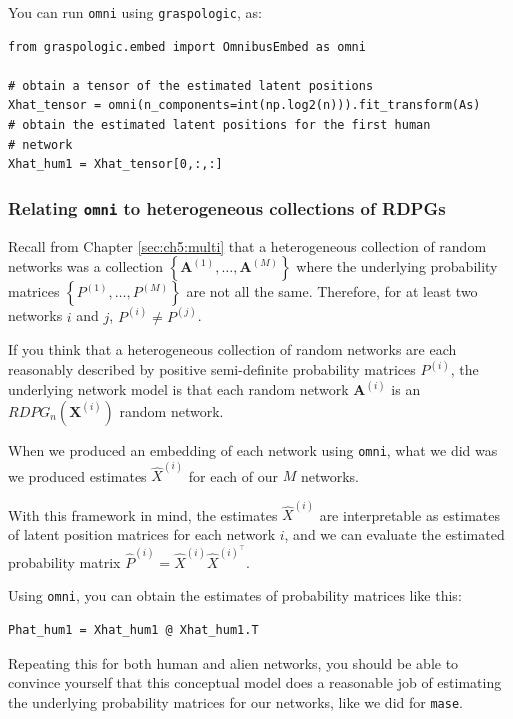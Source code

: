 You can run \texttt{omni} using \texttt{graspologic}, as:

\begin{lstlisting}[style=python]
from graspologic.embed import OmnibusEmbed as omni

# obtain a tensor of the estimated latent positions
Xhat_tensor = omni(n_components=int(np.log2(n))).fit_transform(As)
# obtain the estimated latent positions for the first human
# network
Xhat_hum1 = Xhat_tensor[0,:,:]
\end{lstlisting}

\subsubsection{Relating \texttt{omni} to heterogeneous collections of RDPGs}

Recall from Chapter \ref{sec:ch5:multi} that a heterogeneous collection of random networks was a collection $\left\{\mathbf A^{(1)}, \hdots, \mathbf A^{(M)}\right\}$ where the underlying probability matrices $\left\{P^{(1)}, \hdots, P^{(M)}\right\}$ are not all the same. Therefore, for at least two networks $i$ and $j$, $P^{(i)} \neq P^{(j)}$.

If you think that a heterogeneous collection of random networks are each reasonably described by positive semi-definite probability matrices $P^{(i)}$, the underlying network model is that each random network $\mathbf A^{(i)}$ is an $RDPG_n\left(\mathbf X^{(i)}\right)$ random network. 

When we produced an embedding of each network using \texttt{omni}, what we did was we produced estimates $\hat X^{(i)}$ for each of our $M$ networks. 

With this framework in mind, the estimates $\hat X^{(i)}$ are interpretable as estimates of latent position matrices for each network $i$, and we can evaluate the estimated probability matrix $\hat P^{(i)} = \hat X^{(i)} \hat X^{(i)}^\top$. 

Using \texttt{omni}, you can obtain the estimates of probability matrices like this:

\begin{lstlisting}[style=python]
Phat_hum1 = Xhat_hum1 @ Xhat_hum1.T
\end{lstlisting}

Repeating this for both human and alien networks, you should be able to convince yourself that this conceptual model does a reasonable job of estimating the underlying probability matrices for our networks, like we did for \texttt{mase}.

